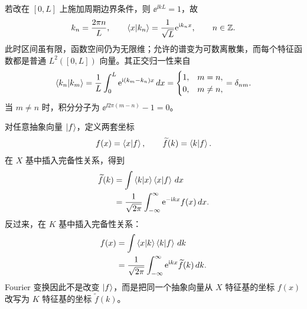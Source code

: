 若改在 $[0,L]$ 上施加周期边界条件，则 $\ee^{\ii kL}=1$，故
\begin{equation}
  k_n=\frac{2\pi n}{L},
  \qquad
  \left\langle x \middle| k_n \right\rangle=\frac1{\sqrt L}\mathrm{e}^{\mathrm{i} k_nx},
  \qquad n\in\mathbb Z.
  \label{eq:QM-C01-S10-periodic-k-spectrum}
\end{equation}
此时区间虽有限，函数空间仍为无限维；允许的谱变为可数离散集，而每个特征函数都是普通 $L^2([0,L])$ 向量。其正交归一性来自
\begin{equation}
  \left\langle k_n \middle| k_m \right\rangle
  =\frac1L\int_0^L\mathrm{e}^{\mathrm{i}(k_m-k_n)x}\,dx
  =\begin{cases}1,&m=n,\\0,&m\neq n,
  \end{cases}
  =\delta_{nm}.
  \label{eq:QM-C01-S10-periodic-orthonormality}
\end{equation}
当 $m\neq n$ 时，积分分子为 $\ee^{\ii2\pi(m-n)}-1=0$。

对任意抽象向量 $\left|f\right\rangle$，定义两套坐标
\[
  f(x)=\left\langle x \middle| f \right\rangle,
  \qquad
  \widetilde f(k)=\left\langle k \middle| f \right\rangle.
\]
在 $X$ 基中插入完备性关系，得到
\begin{align}
  \widetilde f(k)
  &=\int\left\langle k \middle| x \right\rangle\left\langle x \middle| f \right\rangle\,dx \\
  &=\frac1{\sqrt{2\pi}}
    \int_{-\infty}^{\infty}\mathrm{e}^{-\mathrm{i} kx}f(x)\,dx.
  \label{eq:QM-C01-S10-fourier-transform}
\end{align}
反过来，在 $K$ 基中插入完备性关系：
\begin{align}
  f(x)
  &=\int\left\langle x \middle| k \right\rangle\left\langle k \middle| f \right\rangle\,dk \\
  &=\frac1{\sqrt{2\pi}}
    \int_{-\infty}^{\infty}\mathrm{e}^{\mathrm{i} kx}\widetilde f(k)\,dk.
  \label{eq:QM-C01-S10-inverse-fourier-transform}
\end{align}
Fourier 变换因此不是改变 $\left|f\right\rangle$，而是把同一个抽象向量从 $X$ 特征基的坐标 $f(x)$ 改写为 $K$ 特征基的坐标 $\widetilde f(k)$。


